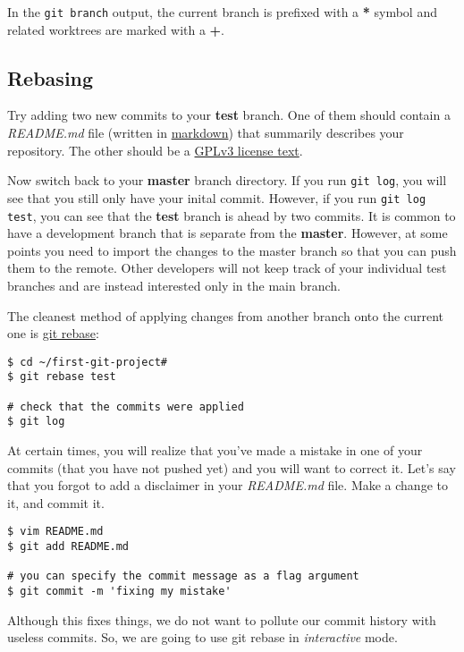 In the \texttt{git branch} output, the current branch is prefixed with a
\textbf{*} symbol and related worktrees are marked with a \textbf{+}.

\subsection{Rebasing}

Try adding two new commits to your \textbf{test} branch. One of them should
contain a \textit{README.md} file (written in
\href{https://www.markdownguide.org/basic-syntax/}{markdown}) that summarily
describes your repository. The other should be a
\href{https://www.gnu.org/licenses/gpl-3.0.en.html#license-text}{GPLv3 license
text}.

Now switch back to your \textbf{master} branch directory. If you run
\texttt{git log}, you will see that you still only have your inital commit.
However, if you run \texttt{git log test}, you can see that the \textbf{test}
branch is ahead by two commits. It is common to have a development branch that
is separate from the \textbf{master}. However, at some points you need to
import the changes to the master branch so that you can push them to the remote.
Other developers will not keep track of your individual test branches and are
instead interested only in the main branch.

The cleanest method of applying changes from another branch onto the current
one is \href{https://man.archlinux.org/man/git-rebase.1}{git rebase}:

\begin{lstlisting}[style=bashstyle]
$ cd ~/first-git-project#
$ git rebase test

# check that the commits were applied
$ git log
\end{lstlisting}

At certain times, you will realize that you've made a mistake in one of your
commits (that you have not pushed yet) and you will want to correct it. Let's
say that you forgot to add a disclaimer in your \textit{README.md} file. Make
a change to it, and commit it.

\begin{lstlisting}[style=bashstyle]
$ vim README.md
$ git add README.md

# you can specify the commit message as a flag argument
$ git commit -m 'fixing my mistake'
\end{lstlisting}

Although this fixes things, we do not want to pollute our commit history with
useless commits. So, we are going to use git rebase in \textit{interactive}
mode.

